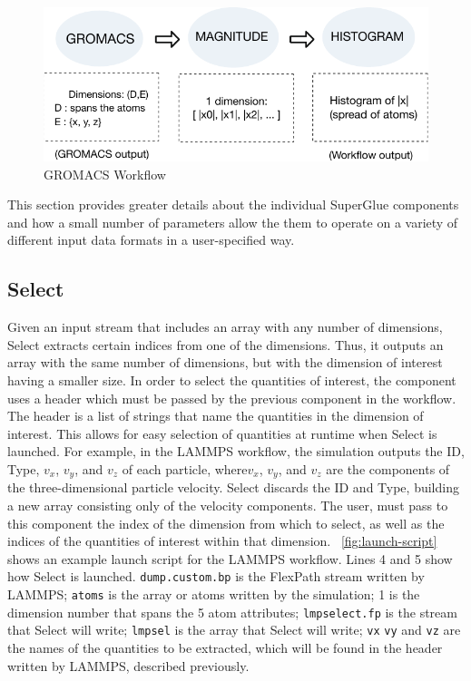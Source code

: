 \begin{figure}
  \center
  \includegraphics[width=\columnwidth]{fig/wflow_gromacs}
  \vspace{-0.25in}
  \caption{GROMACS Workflow}
  \label{fig:gromacs-workflow}
  \vspace{-0.15in}
\end{figure}



This section provides greater details about the individual SuperGlue components
and how a small number of
parameters allow the them to operate on a variety
of different input data formats in
a user-specified way.

\subsection{Select}

Given an input stream that includes an array with
any number of dimensions,
Select extracts certain indices from one of
the dimensions. Thus, it outputs an array
with the same number of dimensions,
but with the dimension of interest having a
smaller size. In order to select the quantities of
interest, the component uses a header which
must be passed by the previous component in the
workflow. The header is a list of strings that
name the quantities in the
dimension of interest. This allows for easy
selection of quantities at runtime when
Select is launched. For example, in the LAMMPS workflow,
the simulation outputs the ID, Type, $v_{x}$, $v_y$, and $v_z$
of each particle, where$v_{x}$, $v_y$, and $v_z$ are the
components of the three-dimensional particle velocity.
Select discards the ID and Type, building a new
array consisting only of the velocity components.
The user, must pass to
this component the index of the dimension
from which to select, as well as the
indices of the quantities of interest within that dimension.
~\autoref{fig:launch-script} shows an example launch
script for the LAMMPS workflow. Lines 4 and 5
show how Select is launched. \verb|dump.custom.bp|
is the FlexPath stream written by LAMMPS; \verb|atoms|
is the array or atoms written by the simulation; 
1 is the dimension number that spans the 5 atom attributes;
\verb|lmpselect.fp| is the stream that Select will write;
\verb|lmpsel| is the array that Select will write;
\verb|vx| \verb|vy| and \verb|vz| are the
names of the quantities
to be extracted, which will be found in the
header written by LAMMPS, described previously.

